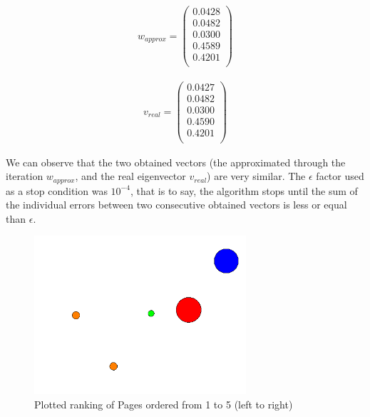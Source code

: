 \documentclass{article}
\begin{document}
\begin{equation*}
\begin{aligned}
w_{approx} = 
\left(
\begin{array}{c}
0.0428\\
0.0482\\
0.0300\\
0.4589\\
0.4201\\
 \end{array}
 \right) 
\end{aligned}
\end{equation*} 

\begin{equation*}
\begin{aligned}
v_{real} = 
\left(
\begin{array}{c}
0.0427\\
0.0482\\
0.0300\\
0.4590\\
0.4201\\
 \end{array}
 \right) 
\end{aligned}
\end{equation*} 

We can observe that the two obtained vectors 
(the approximated
through the iteration $w_{approx}$, 
and the real eigenvector $v_{real}$) are very similar.
The $\epsilon$ factor used as a stop condition was $10^{-4}$,
that is to say, the algorithm stops until the sum of the individual
errors between two consecutive obtained vectors is less or equal
than $\epsilon$.

\begin{figure}[h!]
\centering
\includegraphics[width=0.7\textwidth,natwidth=560,natheight=419]{result.png}
\caption{Plotted ranking of Pages ordered from 1 to 5 (left to right)}
\label{fig:rank}
\end{figure} 



\end{document}

